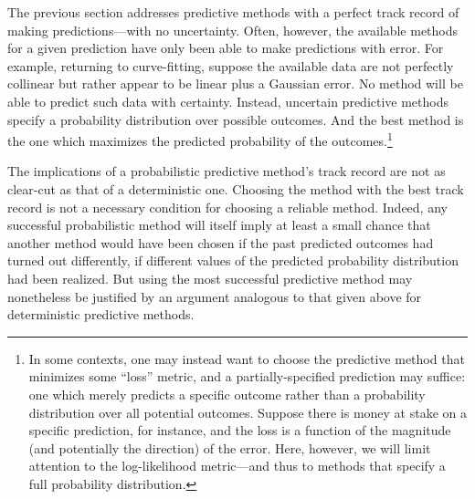\documentclass[
  letterpaper,
  DIV=11,
  numbers=noendperiod]{scrartcl}
\theoremstyle{definition}
\theoremstyle{remark}
\begin{document}
The previous section addresses predictive methods with a perfect track
record of making predictions---with no uncertainty. Often, however, the
available methods for a given prediction have only been able to make
predictions with error. For example, returning to curve-fitting, suppose
the available data are not perfectly collinear but rather appear to be
linear plus a Gaussian error. No method will be able to predict such
data with certainty. Instead, uncertain predictive methods specify a
probability distribution over possible outcomes. And the best method is
the one which maximizes the predicted probability of the
outcomes.\footnote{In some contexts, one may instead want to choose the
  predictive method that minimizes some ``loss'' metric, and a
  partially-specified prediction may suffice: one which merely predicts
  a specific outcome rather than a probability distribution over all
  potential outcomes. Suppose there is money at stake on a specific
  prediction, for instance, and the loss is a function of the magnitude
  (and potentially the direction) of the error. Here, however, we will
  limit attention to the log-likelihood metric---and thus to methods
  that specify a full probability distribution.}

The implications of a probabilistic predictive method's track record are
not as clear-cut as that of a deterministic one. Choosing the method
with the best track record is not a necessary condition for choosing a
reliable method. Indeed, any successful probabilistic method will itself
imply at least a small chance that another method would have been chosen
if the past predicted outcomes had turned out differently, if different
values of the predicted probability distribution had been realized. But
using the most successful predictive method may nonetheless be justified
by an argument analogous to that given above for deterministic
predictive methods.
\end{document}
